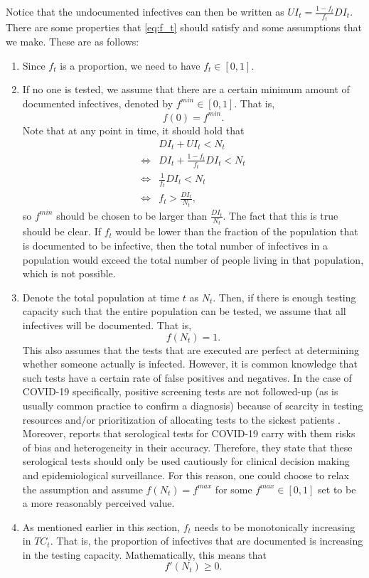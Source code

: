 \documentclass[12pt]{article}
\begin{document}
	Notice that the undocumented infectives can then be written as $UI_t = \frac{1-f_t}{f_t}DI_t$. \\
	
	There are some properties that \eqref{eq:f_t} should satisfy and some assumptions that we make. These are as follows:
	\begin{enumerate}[label=(A\arabic*)]
		\item\label{ass:undoc_proportion} Since $f_t$ is a proportion, we need to have $f_t \in [0,1]$.
		\item\label{ass:undoc_f0} If no one is tested, we assume that there are a certain minimum amount of documented infectives, denoted by $f^{min} \in [0,1]$. That is,
		    \[f(0) = f^{min}.\]
		Note that at any point in time, it should hold that
	    \begin{align*}
    	    & DI_t + UI_t < N_t \\
    	    \iff & DI_t + \frac{1-f_t}{f_t}DI_t < N_t \\
    	    \iff & \frac{1}{f_t}DI_t < N_t \\
    	    \iff & f_t > \frac{DI_t}{N_t},
	    \end{align*}
		so $f^{min}$ should be chosen to be larger than $\frac{DI_t}{N_t}$. The fact that this is true should be clear. If $f_t$ would be lower than the fraction of the population that is documented to be infective, then the total number of infectives in a population would exceed the total number of people living in that population, which is not possible.
		
		\item\label{ass:undoc_fN} Denote the total population at time $t$ as $N_t$. Then, if there is enough testing capacity such that the entire population can be tested, we assume that all infectives will be documented. That is,
		    \[f(N_t) = 1.\]
		This also assumes that the tests that are executed are perfect at determining whether someone actually is infected. However, it is common knowledge that such tests have a certain rate of false positives and negatives. In the case of COVID-19 specifically, positive screening tests are not followed-up (as is usually common practice to confirm a diagnosis) because of scarcity in testing resources and/or prioritization of allocating tests to the sickest patients \parencite{frasier2020tests}. Moreover, \textcite{bmj2020testaccuracy} reports that serological tests for COVID-19 carry with them risks of bias and heterogeneity in their accuracy. Therefore, they state that these serological tests should only be used cautiously for clinical decision making and epidemiological surveillance. For this reason, one could choose to relax the assumption and assume $f(N_t) = f^{max}$ for some $f^{max} \in [0,1]$ set to be a more reasonably perceived value.
		
		\item\label{ass:undoc_monotonicity} As mentioned earlier in this section, $f_t$ needs to be monotonically increasing in $TC_t$. That is, the proportion of infectives that are documented is increasing in the testing capacity. Mathematically, this means that
		    \[f'(N_t) \geq 0.\]
	\end{enumerate}
	
\end{document}
